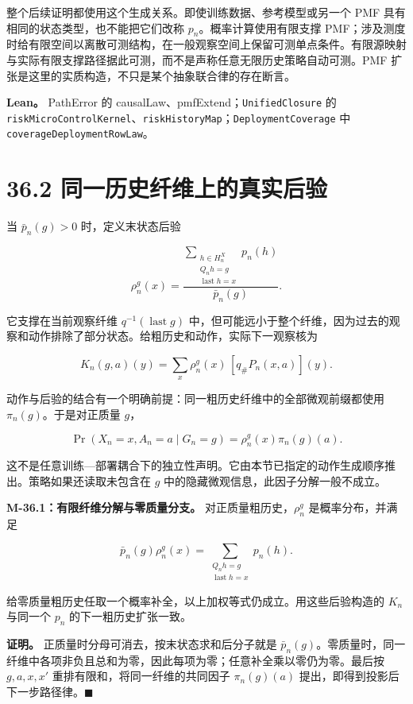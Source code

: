 \documentclass[
  11pt,
  oneside]{book}
\begin{document}
整个后续证明都使用这个生成关系。即使训练数据、参考模型或另一个 PMF 具有相同的状态类型，也不能把它们改称 \(p_n\)。概率计算使用有限支撑 PMF；涉及测度时给有限空间以离散可测结构，在一般观察空间上保留可测单点条件。有限源映射与实际有限支撑路径据此可测，而不是声称任意无限历史策略自动可测。PMF 扩张是这里的实质构造，不只是某个抽象联合律的存在断言。

\textbf{Lean。} PathError 的 causalLaw、pmfExtend；\nolinkurl{UnifiedClosure} 的 \nolinkurl{riskMicroControlKernel}、\nolinkurl{riskHistoryMap}；\nolinkurl{DeploymentCoverage} 中 \nolinkurl{coverageDeploymentRowLaw}。

\section{36.2 同一历史纤维上的真实后验}\label{ux540cux4e00ux5386ux53f2ux7ea4ux7ef4ux4e0aux7684ux771fux5b9eux540eux9a8c}

当 \(\bar p_n(g)>0\) 时，定义末状态后验

\[\rho_n^g(x)=
\frac{\displaystyle\sum_{\substack{h\in H_n^X\\Q_nh=g\\\operatorname{last}h=x}}p_n(h)}
{\bar p_n(g)}.\]

它支撑在当前观察纤维 \(q^{-1}(\operatorname{last}g)\) 中，但可能远小于整个纤维，因为过去的观察和动作排除了部分状态。给粗历史和动作，实际下一观察核为

\[K_n(g,a)(y)=\sum_x\rho_n^g(x)\,[q_\#P_n(x,a)](y).\]

动作与后验的结合有一个明确前提：同一粗历史纤维中的全部微观前缀都使用 \(\pi_n(g)\)。于是对正质量 \(g\)，

\[\Pr(X_n=x,A_n=a\mid G_n=g)=\rho_n^g(x)\pi_n(g)(a).\]

这不是任意训练---部署耦合下的独立性声明。它由本节已指定的动作生成顺序推出。策略如果还读取未包含在 \(g\) 中的隐藏微观信息，此因子分解一般不成立。

\hypertarget{m-36-1}{}\label{m-36-1}

\textbf{M-36.1：有限纤维分解与零质量分支。} 对正质量粗历史，\(\rho_n^g\) 是概率分布，并满足

\[\bar p_n(g)\rho_n^g(x)
=\sum_{\substack{Q_nh=g\\\operatorname{last}h=x}}p_n(h).\]

给零质量粗历史任取一个概率补全，以上加权等式仍成立。用这些后验构造的 \(K_n\) 与同一个 \(p_n\) 的下一粗历史扩张一致。

\textbf{证明。} 正质量时分母可消去，按末状态求和后分子就是 \(\bar p_n(g)\)。零质量时，同一纤维中各项非负且总和为零，因此每项为零；任意补全乘以零仍为零。最后按 \(g,a,x,x'\) 重排有限和，将同一纤维的共同因子 \(\pi_n(g)(a)\) 提出，即得到投影后下一步路径律。\(\blacksquare\)
\end{document}
